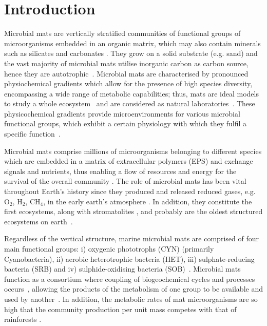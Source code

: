 \section{Introduction}
\label{swamp:intro}

   Microbial mats are vertically stratified communities of functional groups of microorganisms embedded in an organic matrix, 
   which may also contain minerals such as silicates and carbonates 
   \citep{stal_cyanobacterial_2012, bolhuis_molecular_2014, prieto-barajas_microbial_2018}. 
   They grow on a solid substrate (e.g. sand) and the vast majority of microbial mats utilise inorganic carbon as carbon source, 
   hence they are autotrophic~\citep{bolhuis_molecular_2014}. 
   Microbial mats are characterised by pronounced physiochemical gradients which allow for the presence of high species diversity, 
   encompassing a wide range of metabolic capabilities; 
   thus, mats are ideal models to study a whole ecosystem~\citep{al-thani_community_2014} and are considered as 
   natural laboratories~\citep{villanueva_analysis_2007}. 
   These physicochemical gradients provide microenvironments for various microbial functional groups, which exhibit 
   a certain physiology with which they fulfil a specific function~\citep{van_gemerden_microbial_1993}. 
   
   Microbial mats comprise millions of microorganisms belonging to different species which are embedded in a matrix of 
   extracellular polymers (EPS) and exchange signals and nutrients, 
   thus enabling a flow of resources and energy for the survival of the overall community 
   \citep{ruvindy_unravelling_2016, prieto-barajas_microbial_2018}. 
   The role of microbial mats has been vital throughout Earth's history since they produced and released reduced gases, 
   e.g. O$_2$, H$_2$, CH$_4$, in the early earth's atmosphere \citep{hoehler_role_2001}. 
   In addition, they constitute the first ecosystems, along with stromatolites 
   \citep{santoyo_unveiling_2021}, 
   and probably are the oldest structured ecosystems on earth~\citep{van_gemerden_microbial_1993}.

   Regardless of the vertical structure, marine microbial mats are comprised of four main functional groups: 
   i) oxygenic phototrophs (CYN) (primarily Cyanobacteria), 
   ii) aerobic heterotrophic bacteria (HET), 
   iii) sulphate-reducing bacteria (SRB) and 
   iv) sulphide-oxidising bacteria (SOB)~\citep{visscher_microbial_2005}. 
   Microbial mats function as a consortium where coupling of biogeochemical cycles and processes occurs~\citep{paerl_cyanobacterialbacterial_2000}, 
   allowing the products of the metabolism of one group to be available and used by another~\citep{santoyo_unveiling_2021}. 
   In addition, the metabolic rates of mat microorganisms are so high that the community production per unit mass competes with that of rainforests
   \citep{jorgensen_diffusion_1994, krumbein_fossil_2003}. 

